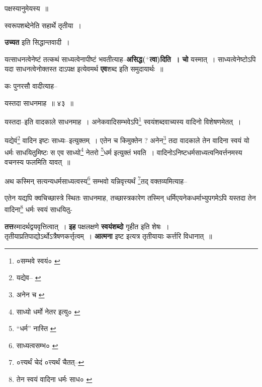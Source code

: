 \documentclass[article,12pt,a4paper]{memoir}
\newcommand{\add}[1]{($^{+}$#1)}
\begin{document}
	  \endgroup
	

	  \pstart पक्षस्यानुमेयस्य ॥
	\pend
      

	  \pstart स्वरूपशब्देनेति सहार्थे तृतीया ।
	\pend
      

	  \pstart \leavevmode{} \textbf{उच्यत} इति सिद्धान्तवादी ।
	\pend
      

	  \pstart यत्साधनत्वेनेष्टं तत्कथं साध्यत्वेनापीष्टं भवतीत्याह--\textbf{असिद्ध\add{त्वा}दिति । चो} यस्मात् । साध्यत्वेनेष्टोऽपि यदा साधनत्वेनोक्तस्त दाऽपक्ष इत्येवमर्थ \textbf{एव}शब्द इति समुदायार्थः ॥
	\pend
	  \bigskip
	  \begingroup
	

	  \pstart कः पुनरसौ वादीत्याह--
	\pend
       
	  \bigskip
	  \begingroup
	

	  \pstart यस्तदा साधनमाह ॥ ४३ ॥
	\pend
      
	  \endgroup
	 

	  \pstart यस्तदा--इति वादकाले साधनमाह । अनेकवादिसम्भवेऽपि\footnote{०सम्भवे स्वयं० \cite{dp-msB} \cite{dp-msC} \cite{dp-msD}} स्वयंशब्दवाच्यस्य वादिनो विशेषणमेतत् ।
	\pend
       

	  \pstart यद्येवं\footnote{यद्येव--\cite{dp-msA} \cite{dp-msB} \cite{dp-edP} \cite{dp-edH}} वादिन इष्टः साध्यः--इत्युक्तम् । एतेन च किमुक्तेन ? अनेन\footnote{अनेन च \cite{dp-msC}} तदा वादकाले तेन वादिना स्वयं यो धर्मः साधयितुमिष्टः स एव साध्यो\footnote{साध्यो धर्मो नेतर इत्यु० \cite{dp-msC}} नेतरो \footnote{“धर्म” नास्ति \cite{dp-msB}}\-धर्म इत्युक्तं भवति । वादिनोऽनिष्टधर्मसाध्यत्वनिवर्त्तनमस्य वचनस्य फलमिति यावत् ॥
	\pend
       

	  \pstart अथ कस्मिन् सत्यन्यधर्मसाध्यत्वस्य\footnote{साध्यत्वसम्भ० \cite{dp-msA} \cite{dp-msC} \cite{dp-edP} \cite{dp-edH} \cite{dp-edE}} सम्भवो यन्निवृत्त्यर्थं \footnote{०त्त्यर्थं चेदं \cite{dp-msA} \cite{dp-msD} \cite{dp-edP} \cite{dp-edH} \cite{dp-edE} \cite{dp-edN} ०त्त्यर्थं चैतत्--\cite{dp-msB}}\-तद् वक्तव्यमित्याह--
	\pend
       
	  \bigskip
	  \begingroup
	

	  \pstart एतेन यद्यपि क्वचिच्छास्त्रे स्थितः साधनमाह, तच्छास्त्रकारेण तस्मिन् धर्मिएयनेकधर्माभ्युपगमेऽपि यस्तदा तेन वादिना\footnote{तेन स्वयं वादिना धर्मः साध० \cite{dp-msC}} धर्मः स्वयं साधयितु-
	\pend
      
	  \endgroup
	
	  \endgroup
	

	  \pstart \textbf{तत्त}स्मादर्थद्वयवृत्तित्वात् । \textbf{इह} पक्षलक्षणे \textbf{स्वयंशब्दो} गृहीत इति शेषः । तृतीयाप्रतिपाद्योऽर्थोऽत्रैषणकर्त्तृत्वम् । \textbf{आत्मना} इष्ट इत्यत्र तृतीयायाः कर्त्तरि विधानात् ॥
	\pend
      
\end{document}

